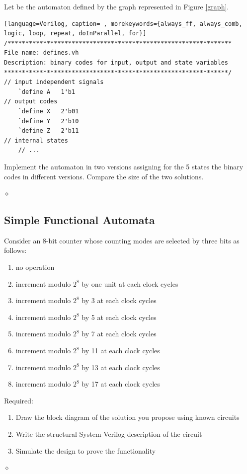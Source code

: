 \begin{problem}
Let be the automaton defined by the graph represented in Figure \ref{graph}.


{\em
{\small
\begin{shaded*}
\begin{lstlisting}[language=Verilog, caption= , morekeywords={always_ff, always_comb, logic, loop, repeat, doInParallel, for}]
/***************************************************************
File name: defines.vh
Description: binary codes for input, output and state variables
***************************************************************/
// input independent signals
    `define A   1'b1
// output codes	
    `define X   2'b01
    `define Y   2'b10
    `define Z   2'b11
// internal states
    // ...
\end{lstlisting}
\end{shaded*}
}}
Implement the automaton in two versions assigning for the 5 states the binary codes in different versions. Compare the size of the two solutions.

$\diamond$
\end{problem}

\subsection{Simple Functional Automata}

\begin{problem}
Consider an 8-bit counter whose counting modes are selected by three bits as follows:
\begin{enumerate}
    \item no operation
    \item increment modulo $2^8$ by one unit at each clock cycles
    \item increment modulo $2^8$ by 3 at each clock cycles
    \item increment modulo $2^8$ by 5 at each clock cycles
    \item increment modulo $2^8$ by 7 at each clock cycles
    \item increment modulo $2^8$ by 11 at each clock cycles
    \item increment modulo $2^8$ by 13 at each clock cycles
    \item increment modulo $2^8$ by 17 at each clock cycles
\end{enumerate}
Required:
\begin{enumerate}
    \item Draw the block diagram of the solution you propose using known circuits
    \item Write the structural System Verilog description of the circuit
    \item Simulate the design to prove the functionality
\end{enumerate}

$\diamond$
\end{problem}

